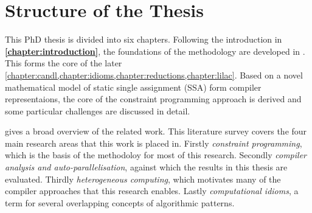 



\newpage
\section{Structure of the Thesis}

    This PhD thesis is divided into six chapters.
    Following the introduction in {\bf\cref{chapter:introduction}},
    the foundations of the methodology are developed in
    {\bf{}}.
    This forms the core of the later
    \cref{chapter:candl,chapter:idioms,chapter:reductions,chapter:lilac}.
    Based on a novel mathematical model of static single assignment (SSA) form
    compiler representaions, the core of the constraint programming approach
    is derived and some particular challenges are discussed in detail.

    {\bf{}} gives a broad overview of the related work.
    This literature survey covers the four main research areas that this work
    is placed in.
    Firstly {\em constraint programming}, which is the basis of the methodoloy
    for most of this research.
    Secondly {\em compiler analysis and auto-parallelisation}, against which the
    results in this thesis are evaluated.
    Thirdly {\em heterogeneous computing}, which motivates many of the compiler
    approaches that this research enables.
    Lastly {\em computational idioms}, a term for several overlapping concepts
    of algorithmic patterns.

